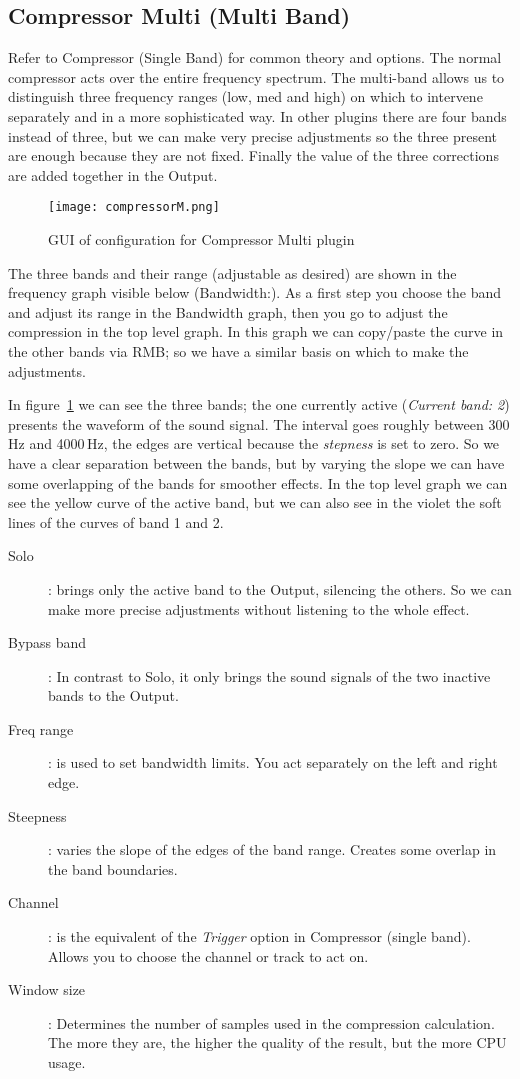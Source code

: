 \subsection{Compressor Multi (Multi Band)}%
\label{sub:compressor_multi}

Refer to Compressor (Single Band) for common theory and options.
The normal compressor acts over the entire frequency spectrum. The multi-band allows us to distinguish three frequency ranges (low, med and high) on which to intervene separately and in a more sophisticated way. In other plugins there are four bands instead of three, but we can make very precise adjustments so the three present are enough because they are not fixed. Finally the value of the three corrections are added together in the Output.

\begin{figure}[htpb]
	\centering
	\texttt{[image: compressorM.png]}
	\caption{GUI of configuration for Compressor Multi plugin}
	\label{fig:compressorM}
\end{figure}

The three bands and their range (adjustable as desired) are shown in the frequency graph visible below (Bandwidth:).
As a first step you choose the band and adjust its range in the Bandwidth graph, then you go to adjust the compression in the top level graph. In this graph we can copy/paste the curve in the other bands via RMB; so we have a similar basis on which to make the adjustments.

In figure~\ref{fig:compressorM} we can see the three bands; the one currently active (\textit{Current band: 2}) presents the waveform of the sound signal. The interval goes roughly between 300\,Hz and 4000\,Hz, the edges are vertical because the \textit{stepness} is set to zero. So we have a clear separation between the bands, but by varying the slope we can have some overlapping of the bands for smoother effects. In the top level graph we can see the yellow curve of the active band, but we can also see in the violet the soft lines of the curves of band 1 and 2.

\begin{description}
	\item[Solo]: brings only the active band to the Output, silencing the others. So we can make more precise adjustments without listening to the whole effect.
	\item[Bypass band]: In contrast to Solo, it only brings the sound signals of the two inactive bands to the Output.
	\item[Freq range]: is used to set bandwidth limits. You act separately on the left and right edge.
	\item[Steepness]: varies the slope of the edges of the band range. Creates some overlap in the band boundaries.
	\item[Channel]: is the equivalent of the \textit{Trigger} option in Compressor (single band). Allows you to choose the channel or track to act on.
	\item[Window size]: Determines the number of samples used in the compression calculation. The more they are, the higher the quality of the result, but the more CPU usage.
\end{description}

